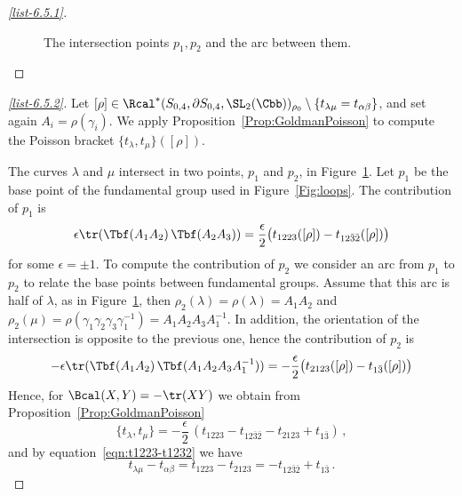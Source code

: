 \begin{proofc}
\begin{proof}[\eqref{list-6.5.1}]
\begin{figure}[h]
\begin{center}
\end{center}
\caption{The intersection points $p_1,p_2$ and the arc between them.}\label{Fig:intersection}
\end{figure}
\let\qed\relax
\end{proof}

\begin{proof}[\eqref{list-6.5.2}]
Let $[\rho]\in \Rcal^*(S_{0,4},\partial S_{0,4}, \SL_2(\Cbb))_{\rho_0}\setminus\{t_{\lambda\mu}=t_{\alpha\beta}\}$, and set again $A_i=\rho(\gamma_i)$. We apply Proposition~\ref{Prop:GoldmanPoisson} to compute the Poisson bracket $\{t_\lambda,t_\mu\}([\rho])$.

The curves $\lambda$ and $\mu$ intersect in two points, $p_1$ and $p_2$, in Figure~\ref{Fig:intersection}. Let $p_1$ be the base point of the fundamental group used in Figure~\ref{Fig:loops}. The contribution of $p_1$ is
\[
\epsilon \tr(\operatorname{\Tbf}(A_1A_2) \operatorname{\Tbf}(A_2A_3))=
\frac{\epsilon }2\big(t_{1223}([\rho]) -t_{12\bar3\bar 2}([\rho])\big)
\]
for some $\epsilon=\pm 1$. To compute the contribution of $p_2$ we consider an arc from $p_1$ to $p_2$ to relate the base points between fundamental groups. Assume that this arc is half of $\lambda$, as in Figure~\ref{Fig:intersection}, then $\rho_2(\lambda)=\rho(\lambda)=A_1A_2$ and $\rho_2(\mu)=\rho(\gamma_1\gamma_2\gamma_3 \gamma_1^{-1})= A_1 A_2 A_3 A_1^{-1}$. In addition, the orientation of the intersection is opposite to the previous one, hence the contribution of $p_2$ is
\[
-\epsilon
\tr(\operatorname{\Tbf}(A_1A_2) \operatorname{\Tbf}(A_1 A_2 A_3 A_1^{-1}))=- \frac{\epsilon }2 \big(t_{2123}([\rho]) -t_{1\bar 3}([\rho])\big)
\]
Hence, for $\Bcal(X,Y)=-\tr(X Y)$ we obtain from Proposition~\ref{Prop:GoldmanPoisson}
\[
\{t_\lambda,t_\mu\}= -\frac\epsilon2\,(t_{1223} -t_{12\bar3\bar 2}-t_{2123} +t_{1\bar 3}) \,,
\]
and by equation~\eqref{eqn:t1223-t1232} we have
\[
t_{\lambda\mu} - t_{\alpha\beta} = t_{1223} -t_{2123}= -t_{12\bar3\bar 2} +t_{1\bar 3}\,.
\]


\end{proof}
\end{proofc}
